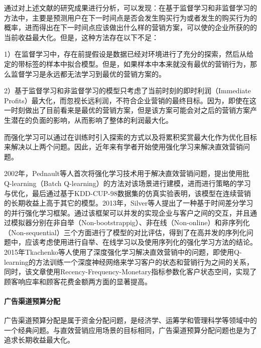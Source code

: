 通过对上述文献的研究成果进行分析，可以发现：在基于监督学习和非监督学习的方法中，主要是预测用户在下一时间点是否会发生购买行为或者发生的购买行为的概率，进而得出在下一时间点应该做出什么样的营销方案，可以使的企业所获的的当前收益最大化。但是，这种方法存在以下不足：

1）在监督学习中，存在前提假设是数据已经对环境进行了充分的探索，然后从给定的带标签的样本中拟合模型。但是，如果样本中本来就没有最优的营销行为，那么监督学习是永远都无法学习到最优的营销方案的。

2）基于监督学习和非监督学习的模型只考虑了当前时刻的即时利润（Immediate Profits）最大化，而忽视长远利润，不符合企业营销的最终目标。因为，即使在这一时刻做出了目前看来是最优的营销方案，但是该方案可能会对之后的营销方案产生潜在的负面的影响，从而影响了整体的利润最大化。


而强化学习可以通过在训练时引入探索的方式以及将累积奖赏最大化作为优化目标来解决以上两个问题。因此，近年来有学者开始使用强化学习来解决直效营销问题。

2002年，Pednault等人\citep{pednault2002sequential}首次将强化学习技术用于解决直效营销问题，提出使用批Q-learning（Batch Q-learning）的方法对该场景进行建模，进而进行策略的学习与优化，最后通过基于KDD-CUP-98数据集的仿真实验表明，该模型在连续营销的长期收益上高于其它的模型。2013年，Silver等人\citep{silver2013concurrent}提出了一种基于时间差分学习的并行强化学习框架。通过该框架可以并发的实现企业与客户之间的交互，并且通过模拟器分别在非自举（Non-bootstrappig）、非在线（Non-online）和非序列化（Non-sequential）三个方面进行了模型的对比评估，得到了在高并发的序列化问题中，应该考虑使用进行自举、在线学习以及使用序列化的强化学习方法的结论。2015年Tkachenko等人\citep{tkachenko2015autonomous}使用了深度强化学习解决直效营销中的问题，即使用Q-learning的方法训练一个深度神经网络来学习客户的状态和营销行为之间的关系，同时，该文章使用Recency-Frequency-Monetary指标参数化客户状态空间，实现了顾客响应率和顾客花费金额两方面的显著提高。

\paragraph{广告渠道预算分配}
广告渠道预算分配是属于资金分配问题，是经济学、运筹学和管理科学等领域中的一个经典问题\citep{zhang2017multi}。与直效营销应用场景的目标相同，广告渠道预算分配问题也是为了追求长期收益最大化。

